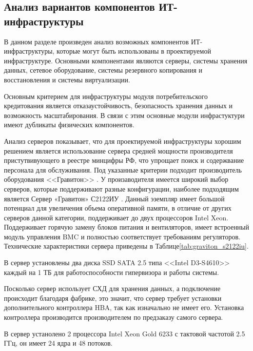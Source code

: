 \documentclass[14pt, a4paper]{extarticle}
\begin{document}
\subsection{Анализ вариантов компонентов ИТ-инфраструктуры}

В данном разделе произведен анализ возможных компонентов ИТ-инфраструктуры,
которые могут быть использованы в проектируемой инфраструктуре. Основными
компонентами являются серверы, системы хранения данных, сетевое оборудование,
системы резервного копирования и восстановления и системы виртуализации.

Основным критерием для инфраструктуры модуля потребительского кредитования
является отказаустойчивость, безопасность хранения данных и возможность
масштабирования. В связи с этим основные модули инфрастуктури имеют дубликаты
физических компонентов.

Анализ серверов показывает, что для проектируемой инфраструктуры хорошим решением
является использование сервера средней мощности производителя пристутвивующего
в реестре минцифры РФ, что упрощает поиск и содержвание персонала для
обслуживания. Под указанные критерии подходит производитель оборудования <<Гравитон>> \cite{graviton-site}.
У произаводителя имеется широкий выбор серверов, которые поддерживают
разные конфигурации, наиболее подходящим является Сервер «Гравитон» С2122ИУ \cite{graiton-server-s2122iu}.
Данный эземпляр имеет большой потенциал для увеличения объема оперативной памяти,
в отличие от других серверов данной категории, поддерживает до двух процессоров Intel
Xeon. Поддерживает горячую замену блоков питания и вентиляторов, имеет встроенный
модуль управления BMC и полностью соответствует требованиям регуляторов.
Технические характеристики сервера приведены в Таблице\;\ref{tab:graviton_s2122iu}.

В сервер установлены два диска SSD SATA 2.5 типа <<Intel D3-S4610>> каждый на
1 ТБ для работоспособности гипервизора и работы системы.

Посколько сервер использует СХД для хранения данных, а подключение происходит
благодаря фабрике, это значит, что сервер требует установки дополнительного
контроллера HBA, так как изначально не имеет его. Установка контроллера
производится производителем по предзаказу самого сервера.

В сервер устанолено 2 процессора Intel Xeon Gold 6233 с тактовой частотой 2.5 ГГц,
он имеет 24 ядра и 48 потоков.
\end{document}
